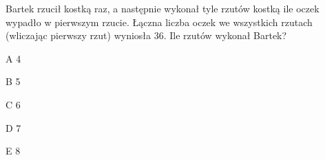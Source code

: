 \begin{tresc}
Bartek rzucił kostką raz, a następnie wykonał tyle rzutów kostką ile oczek wypadło w pierwszym rzucie. Łączna liczba oczek we wszystkich rzutach (wliczając pierwszy rzut) wyniosła 36. Ile rzutów wykonał Bartek?
\end{tresc}
\begin{wariant}{A} 4 \end{wariant}
\begin{wariant}{B} 5 \end{wariant}
\begin{wariant}{C} 6 \end{wariant}
\begin{wariant}{D} 7 \end{wariant}
\begin{wariant}{E} 8 \end{wariant}

